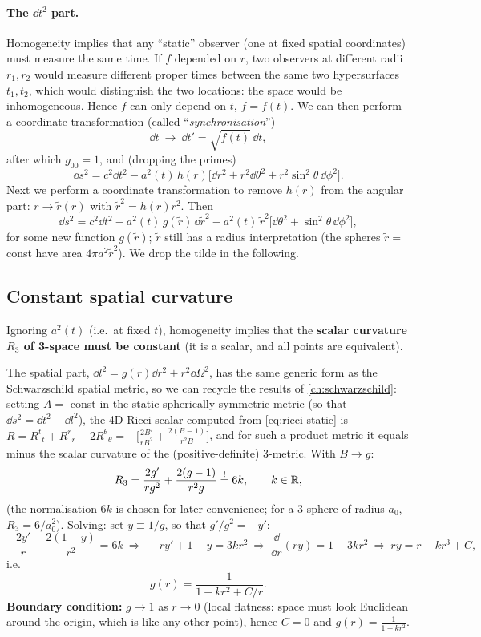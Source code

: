 \paragraph{The $\dd t^2$ part.} Homogeneity implies that any ``static'' observer (one at fixed spatial coordinates) must measure the same time. If $f$ depended on $r$, two observers at different radii $r_1,r_2$ would measure different proper times between the same two hypersurfaces $t_1,t_2$, which would distinguish the two locations: the space would be inhomogeneous. Hence $f$ can only depend on $t$, $f=f(t)$. We can then perform a coordinate transformation (called ``\emph{synchronisation}'')
\[
  \dd t\ \to\ \dd t'=\sqrt{f(t)}\,\dd t,
\]
after which $g_{00}=1$, and (dropping the primes)
\begin{equation}
  \dd s^2=c^2\dd t^2-a^2(t)\,h(r)\big[\dd r^2+r^2\dd\theta^2+r^2\sin^2\theta\,\dd\phi^2\big].
\end{equation}
Next we perform a coordinate transformation to remove $h(r)$ from the angular part: $r\to\tilde r(r)$ with $\tilde r^2=h(r)r^2$. Then
\begin{equation}
  \dd s^2=c^2\dd t^2-a^2(t)\,g(\tilde r)\,\dd\tilde r^2-a^2(t)\,\tilde r^2\big[\dd\theta^2+\sin^2\theta\,\dd\phi^2\big],
\end{equation}
for some new function $g(\tilde r)$; $\tilde r$ still has a radius interpretation (the spheres $\tilde r=$ const have area $4\pi a^2\tilde r^2$). We drop the tilde in the following.

\subsection{Constant spatial curvature}
Ignoring $a^2(t)$ (i.e.\ at fixed $t$), homogeneity implies that the \textbf{scalar curvature $R_3$ of 3-space must be constant} (it is a scalar, and all points are equivalent).

The spatial part, $\dd l^2=g(r)\dd r^2+r^2\dd\Omega^2$, has the same generic form as the Schwarzschild spatial metric, so we can recycle the results of \cref{ch:schwarzschild}: setting $A=$ const in the static spherically symmetric metric (so that $\dd s^2=\dd t^2-\dd l^2$), the 4D Ricci scalar computed from \eqref{eq:ricci-static} is $R=R^t{}_t+R^r{}_r+2R^\theta{}_\theta=-\big[\frac{2B'}{rB^2}+\frac{2(B-1)}{r^2B}\big]$, and for such a product metric it equals minus the scalar curvature of the (positive-definite) 3-metric. With $B\to g$:
\begin{equation}
  R_3=\frac{2g'}{rg^2}+\frac{2(g-1)}{r^2g}\overset{!}{=}6k,\qquad k\in\mathbb{R} ,
\end{equation}
(the normalisation $6k$ is chosen for later convenience; for a 3-sphere of radius $a_0$, $R_3=6/a_0^2$). Solving: set $y\equiv1/g$, so that $g'/g^2=-y'$:
\[
  -\frac{2y'}{r}+\frac{2(1-y)}{r^2}=6k\ \Longrightarrow\ -ry'+1-y=3kr^2\ \Longrightarrow\ \frac{\dd}{\dd r}(ry)=1-3kr^2\ \Longrightarrow\ ry=r-kr^3+C ,
\]
i.e.
\[
  g(r)=\frac{1}{1-kr^2+C/r}.
\]
\textbf{Boundary condition:} $g\to1$ as $r\to0$ (local flatness: space must look Euclidean around the origin, which is like any other point), hence $C=0$ and $g(r)=\frac{1}{1-kr^2}$.


